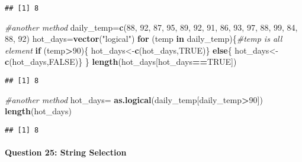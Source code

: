 \documentclass[
]{article}
\newenvironment{Shaded}{\begin{snugshade}}{\end{snugshade}}
\newcommand{\CommentTok}[1]{\textcolor[rgb]{0.56,0.35,0.01}{\textit{#1}}}
\newcommand{\ConstantTok}[1]{\textcolor[rgb]{0.56,0.35,0.01}{#1}}
\newcommand{\ControlFlowTok}[1]{\textcolor[rgb]{0.13,0.29,0.53}{\textbf{#1}}}
\newcommand{\DecValTok}[1]{\textcolor[rgb]{0.00,0.00,0.81}{#1}}
\newcommand{\FunctionTok}[1]{\textcolor[rgb]{0.13,0.29,0.53}{\textbf{#1}}}
\newcommand{\NormalTok}[1]{#1}
\newcommand{\OtherTok}[1]{\textcolor[rgb]{0.56,0.35,0.01}{#1}}
\newcommand{\SpecialCharTok}[1]{\textcolor[rgb]{0.81,0.36,0.00}{\textbf{#1}}}
\newcommand{\StringTok}[1]{\textcolor[rgb]{0.31,0.60,0.02}{#1}}
\begin{document}
\begin{verbatim}
## [1] 8
\end{verbatim}

\begin{Shaded}
\begin{Highlighting}[]
\CommentTok{\#another method}
\NormalTok{daily\_temp}\OtherTok{=}\FunctionTok{c}\NormalTok{(}\DecValTok{88}\NormalTok{, }\DecValTok{92}\NormalTok{, }\DecValTok{87}\NormalTok{, }\DecValTok{95}\NormalTok{, }\DecValTok{89}\NormalTok{, }\DecValTok{92}\NormalTok{, }\DecValTok{91}\NormalTok{, }\DecValTok{86}\NormalTok{, }\DecValTok{93}\NormalTok{, }\DecValTok{97}\NormalTok{, }\DecValTok{88}\NormalTok{, }\DecValTok{99}\NormalTok{, }\DecValTok{84}\NormalTok{, }\DecValTok{88}\NormalTok{, }\DecValTok{92}\NormalTok{)}
\NormalTok{hot\_days}\OtherTok{=}\FunctionTok{vector}\NormalTok{(}\StringTok{"logical"}\NormalTok{)}
\ControlFlowTok{for}\NormalTok{ (temp }\ControlFlowTok{in}\NormalTok{ daily\_temp)\{}\CommentTok{\#temp is all element}
  \ControlFlowTok{if}\NormalTok{ (temp}\SpecialCharTok{\textgreater{}}\DecValTok{90}\NormalTok{)\{}
\NormalTok{    hot\_days}\OtherTok{\textless{}{-}}\FunctionTok{c}\NormalTok{(hot\_days,}\ConstantTok{TRUE}\NormalTok{)\}}
  \ControlFlowTok{else}\NormalTok{\{}
\NormalTok{    hot\_days}\OtherTok{\textless{}{-}}\FunctionTok{c}\NormalTok{(hot\_days,}\ConstantTok{FALSE}\NormalTok{)\}}
\NormalTok{\}}
\FunctionTok{length}\NormalTok{(hot\_days[hot\_days}\SpecialCharTok{==}\ConstantTok{TRUE}\NormalTok{])}
\end{Highlighting}
\end{Shaded}

\begin{verbatim}
## [1] 8
\end{verbatim}

\begin{Shaded}
\begin{Highlighting}[]
\CommentTok{\#another method}
\NormalTok{hot\_days}\OtherTok{=} \FunctionTok{as.logical}\NormalTok{(daily\_temp[daily\_temp}\SpecialCharTok{\textgreater{}}\DecValTok{90}\NormalTok{])}
\FunctionTok{length}\NormalTok{(hot\_days)}
\end{Highlighting}
\end{Shaded}

\begin{verbatim}
## [1] 8
\end{verbatim}

\hypertarget{question-25-string-selection}{%
\paragraph{Question 25: String
Selection}\label{question-25-string-selection}}
\end{document}
